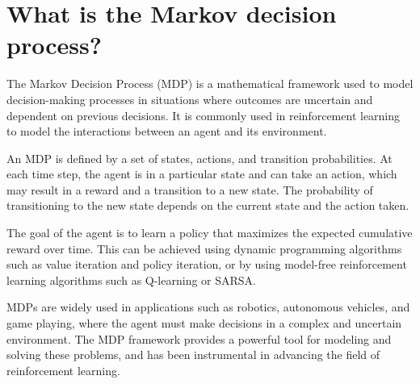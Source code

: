 \section{What is the Markov decision process?}
The Markov Decision Process (MDP) is a mathematical framework used to model decision-making processes in situations where outcomes are uncertain and dependent on previous decisions. It is commonly used in reinforcement learning to model the interactions between an agent and its environment.

An MDP is defined by a set of states, actions, and transition probabilities. At each time step, the agent is in a particular state and can take an action, which may result in a reward and a transition to a new state. The probability of transitioning to the new state depends on the current state and the action taken.

The goal of the agent is to learn a policy that maximizes the expected cumulative reward over time. This can be achieved using dynamic programming algorithms such as value iteration and policy iteration, or by using model-free reinforcement learning algorithms such as Q-learning or SARSA.

MDPs are widely used in applications such as robotics, autonomous vehicles, and game playing, where the agent must make decisions in a complex and uncertain environment. The MDP framework provides a powerful tool for modeling and solving these problems, and has been instrumental in advancing the field of reinforcement learning.

